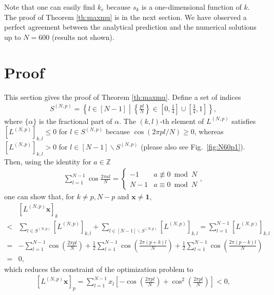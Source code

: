 Note that one can easily find $k_{\mathrm{c}}$ because $s_{k}$ is a one-dimensional function of $k$. The proof of Theorem \ref{th:maxmu} is in the next section. We have observed a perfect agreement between the analytical prediction and the numerical solutions up to $N=600$ (results not shown).

\section{Proof}
\label{sec:proof}
This section gives the proof of Theorem \ref{th:maxmu}. Define a set of indices
\begin{align}
    S^{(N,p)} = \left\{l\in[N-1] \mathrel{}\middle|\mathrel{} \left\{\frac{pl}{N}\right\} \in \left[0,\frac{1}{4}\right]\cup \left[\frac{3}{4}, 1\right] \right\},
\end{align}
where $\{\alpha\}$ is the fractional part of $\alpha$. The $(k,l)$-th element of $L^{(N,p)}$ satisfies $\left[L^{(N,p)}\right]_{k,l}\leq 0$ for $l\in S^{(N,p)}$ because $\cos(2\pi pl/N)\geq 0$, whereas $\left[L^{(N,p)}\right]_{k,l}> 0$ for $l\in [N-1]\backslash S^{(N,p)}$ (please also see Fig.~\ref{fig:N60p1}). Then, using the identity for $a\in \mathbb{Z}$
\begin{align}
    \sum_{l=1}^{N-1}\cos\frac{2\pi al}{N} = 
    \left\{
        \begin{array}{ll}
            -1 & a\not\equiv 0 \bmod N\\
            N-1 & a\equiv 0\bmod N
        \end{array}
    \right. ,
\end{align}
one can show that, for $k\neq p, N-p$ and $\bm{x}\neq \bm{1}$,
\begin{align}
    &\left[L^{(N,p)}\bm{x}\right]_{k}\\
    <&\sum_{l\in S^{(N,p)}}\left[L^{(N,p)}\right]_{k,l}
    +\sum_{l\in[N-1]\backslash S^{(N,p)}}\left[L^{(N,p)}\right]_{k,l}
    =\sum_{l=1}^{N-1}\left[L^{(N,p)}\right]_{k,l}\\
    =&-\sum_{l=1}^{N-1}\cos\left(\frac{2\pi pl}{N}\right)+
    \frac{1}{2}\sum_{l=1}^{N-1}\cos\left(\frac{2\pi (p+k)l}{N}\right)
    +\frac{1}{2}\sum_{l=1}^{N-1}\cos\left(\frac{2\pi (p-k)l}{N}\right)\\
    =& 0,
\end{align}
which reduces the constraint of the optimization problem to
\begin{align}
    \left[L^{(N,p)}\bm{x}\right]_{p} = \sum_{l=1}^{N-1}x_{l}\left[-\cos\left(\frac{2\pi pl}{N}\right)+\cos^2\left(\frac{2\pi pl}{N}\right)\right] < 0,
    \label{eq:constraint_p}
\end{align}
